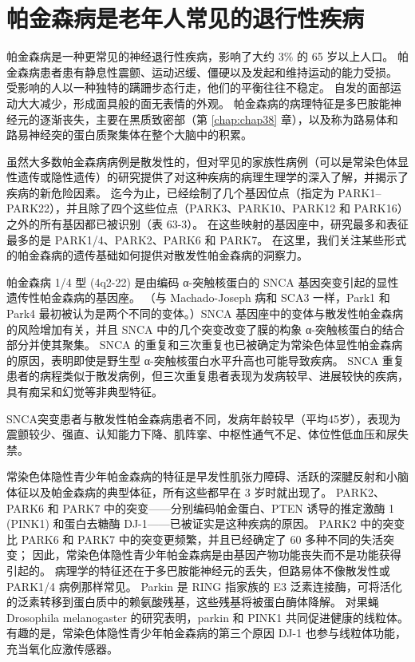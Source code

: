 \section{帕金森病是老年人常见的退行性疾病}

帕金森病是一种更常见的神经退行性疾病，影响了大约 3\% 的 65 岁以上人口。
帕金森病患者患有静息性震颤、运动迟缓、僵硬以及发起和维持运动的能力受损。
受影响的人以一种独特的蹒跚步态行走，他们的平衡往往不稳定。
自发的面部运动大大减少，形成面具般的面无表情的外观。
帕金森病的病理特征是多巴胺能神经元的逐渐丧失，主要在黑质致密部（第 \ref{chap:chap38} 章），以及称为路易体和路易神经突的蛋白质聚集体在整个大脑中的积累。


虽然大多数帕金森病病例是散发性的，但对罕见的家族性病例（可以是常染色体显性遗传或隐性遗传）的研究提供了对这种疾病的病理生理学的深入了解，并揭示了疾病的新危险因素。
迄今为止，已经绘制了几个基因位点（指定为 PARK1–PARK22），并且除了四个这些位点（PARK3、PARK10、PARK12 和 PARK16）之外的所有基因都已被识别（表 63-3）。
在这些映射的基因座中，研究最多和表征最多的是 PARK1/4、PARK2、PARK6 和 PARK7。
在这里，我们关注某些形式的帕金森病的遗传基础如何提供对散发性帕金森病的洞察力。


帕金森病 1/4 型 (4q2-22) 是由编码 α-突触核蛋白的 SNCA 基因突变引起的显性遗传性帕金森病的基因座。
（与 Machado-Joseph 病和 SCA3 一样，Park1 和 Park4 最初被认为是两个不同的变体。）SNCA 基因座中的变体与散发性帕金森病的风险增加有关，并且 SNCA 中的几个突变改变了膜的构象 α-突触核蛋白的结合部分并使其聚集。
SNCA 的重复和三次重复也已被确定为常染色体显性帕金森病的原因，表明即使是野生型 α-突触核蛋白水平升高也可能导致疾病。
SNCA 重复患者的病程类似于散发病例，但三次重复患者表现为发病较早、进展较快的疾病，具有痴呆和幻觉等非典型特征。


SNCA突变患者与散发性帕金森病患者不同，发病年龄较早（平均45岁），表现为震颤较少、强直、认知能力下降、肌阵挛、中枢性通气不足、体位性低血压和尿失禁。


常染色体隐性青少年帕金森病的特征是早发性肌张力障碍、活跃的深腱反射和小脑体征以及帕金森病的典型体征，所有这些都早在 3 岁时就出现了。
PARK2、PARK6 和 PARK7 中的突变——分别编码帕金蛋白、PTEN 诱导的推定激酶 1 (PINK1) 和蛋白去糖酶 DJ-1——已被证实是这种疾病的原因。
PARK2 中的突变比 PARK6 和 PARK7 中的突变更频繁，并且已经确定了 60 多种不同的失活突变；
因此，常染色体隐性青少年帕金森病是由基因产物功能丧失而不是功能获得引起的。
病理学的特征还在于多巴胺能神经元的丢失，但路易体不像散发性或 PARK1/4 病例那样常见。
Parkin 是 RING 指家族的 E3 泛素连接酶，可将活化的泛素转移到蛋白质中的赖氨酸残基，这些残基将被蛋白酶体降解。
对果蝇 Drosophila melanogaster 的研究表明，parkin 和 PINK1 共同促进健康的线粒体。
有趣的是，常染色体隐性青少年帕金森病的第三个原因 DJ-1 也参与线粒体功能，充当氧化应激传感器。


